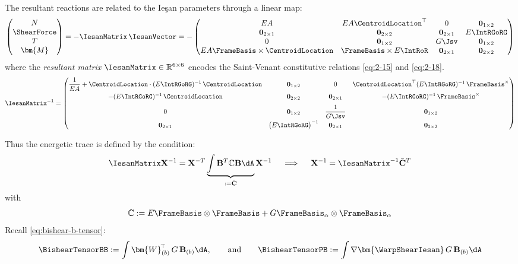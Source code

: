 The resultant reactions are related to the Ieşan parameters through a linear map:
\begin{equation}
\begin{pmatrix} 
N  \\ \ShearForce \\  T \\ \bm{M} 
\end{pmatrix}
= -\IesanMatrix \, \IesanVector
= -\begin{pmatrix}
EA & EA\CentroidLocation^\top & 0 & \mathbf{0}_{1\times2} \\
\mathbf{0}_{2\times1} & \mathbf{0}_{2\times2} & \mathbf{0}_{2\times1} & E\IntRGoRG \\
0 & \mathbf{0}_{1\times 2} & G\Jsv & \mathbf{0}_{1\times2} \\
EA \FrameBasis\times\CentroidLocation & \FrameBasis\times E\IntRoR & \mathbf{0}_{2\times 1} & \mathbf{0}_{2\times2} \\
\end{pmatrix}
\label{eq:resultant-map}
\end{equation}
where the \emph{resultant matrix} $\IesanMatrix \in \mathbb{R}^{6 \times 6}$ 
encodes the Saint-Venant constitutive relations  \eqref{eq:2-15} and \eqref{eq:2-18}.
$$
\IesanMatrix^{-1} =
\begin{pmatrix}
\displaystyle \frac{1}{EA} + \CentroidLocation\cdot (E\IntRGoRG)^{-1}\,\CentroidLocation
& \mathbf{0}_{1\times2}
& 0
& \CentroidLocation^\top (E\IntRGoRG)^{-1}\,\FrameBasis^\times
\\[6pt]
-(E\IntRGoRG)^{-1}\,\CentroidLocation
& \mathbf{0}_{2\times2}
& \mathbf{0}_{2\times1}
& -(E\IntRGoRG)^{-1}\,\FrameBasis^\times
\\[6pt]
0
& \mathbf{0}_{1\times2}
& \displaystyle \frac{1}{G\Jsv}
& \mathbf{0}_{1\times2}
\\[6pt]
\mathbf{0}_{2\times1}
& \bigl(E\IntRGoRG\bigr)^{-1}
& \mathbf{0}_{2\times1}
& \mathbf{0}_{2\times2}
\end{pmatrix}
$$

Thus the energetic trace is defined by the condition:
\[
\IesanMatrix \mathbf{X}^{-1} = \mathbf{X}^{-T}\underbrace{\int \mathbf{B}^T\mathbb{C}\mathbf{B}\dA}_{:=\bar{\mathbf{C}}} \mathbf{X}^{-1}
\quad\implies\quad 
\mathbf{X}^{-1} = \IesanMatrix^{-1} \bar{\mathbf{C}}^T
\]
with 
\[
\mathbb{C} := E\FrameBasis\otimes\FrameBasis + G\FrameBasis_{\alpha}\otimes\FrameBasis_{\alpha}
\]
Recall \eqref{eq:bishear-b-tensor}:
\begin{equation*}
\BishearTensorBB := \int\bm{W}_{(b)}^{\!\top}\,G\,\mathbf{B}_{(b)}\dA,
\qquad\text{and}\qquad 
\BishearTensorPB := \int\nabla\bm{\WarpShearIesan}\,G\,\mathbf{B}_{(b)}\dA
\end{equation*}

